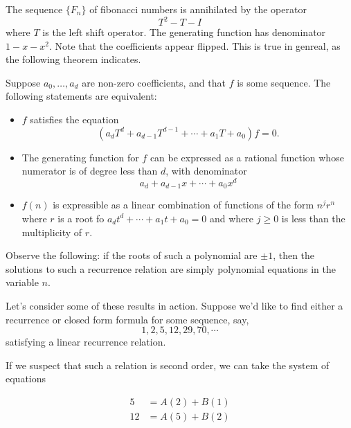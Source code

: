 The sequence $\{F_n\}$ of fibonacci numbers is annihilated by the operator
\[T^2 - T - I\]
where $T$ is the left shift operator. The generating function has denominator $1-x-x^2$. Note that the coefficients appear flipped. This is true in genreal, as the following theorem indicates.
\begin{theorem}
Suppose $a_0, \dots, a_d$ are non-zero coefficients, and that $f$ is some sequence. The following statements are equivalent:
\begin{itemize}
	\item $f$ satisfies the equation
	\[(a_dT^d + a_{d-1}T^{d-1} + \cdots + a_1T + a_0)f = 0.\]
	\item The generating function for $f$ can be expressed as a rational function whose numerator is of degree less than $d$, with denominator
	\[a_d + a_{d-1}x + \cdots + a_0x^d\]
	\item $f(n)$ is expressible as a linear combination of functions of the form $n^jr^n$ where $r$ is a root fo $a_dt^d + \cdots + a_1t + a_0 = 0$ and where $j \geq 0$ is less than the multiplicity of $r$.
\end{itemize}
\end{theorem}

Observe the following: if the roots of such a polynomial are $\pm 1$, then the solutions to such a recurrence relation are simply polynomial equations in the variable $n$.

Let's consider some of these results in action. Suppose we'd like to find either a recurrence or closed form formula for some sequence, say,
\[1, 2, 5, 12, 29, 70, \cdots\] satisfying a linear recurrence relation.

If we suspect that such a relation is second order, we can take the system of equations

\begin{align*}
	5 &= A(2) + B(1) \\
	12 &= A(5) + B(2)
\end{align*}

